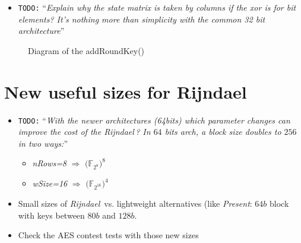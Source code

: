 \documentclass[10pt,a4paper,twoside]{llncs}
\newcommand{\todo}[1]{\texttt{\color{red}TODO:} ``\emph{#1}''}
\newcommand{\rijndael}{\emph{Rijndael}}
\newcommand{\Fq}[1]{\ensuremath{\mathbb{F}_#1}}
\newcommand{\Fpn}[2]{\ensuremath{\mathbb{F}_{#1^#2}}}
\begin{document}
\begin{itemize}
 \item \todo{Explain why the state matrix is taken by columns if the \emph{xor} is for bit elements? It's nothing more than simplicity with the common 32 bit architecture}
\end{itemize}

\begin{figure}[ht]
\begin{center}

\caption{Diagram of the addRoundKey()}
\label{fig:addRoundKey}
\end{center}
\end{figure}


\section{New useful sizes for Rijndael}\label{sec:newSizes}
\begin{itemize}
    \item \todo{With the newer architectures (64bits) which parameter changes can improve the cost of the \rijndael\,? \cite{Daemen:1999:EBC:1267115.1267119} In $64$ bits arch, a block size doubles to $256$ in two ways:} 
    \begin{itemize}
        \item \emph{nRows=8} $\Rightarrow$ $($\Fpn{2}{8}$)^8$
        \item \emph{wSize=16} $\Rightarrow$ $($\Fpn{2}{{16}}$)^4$
    \end{itemize}
    \item Small sizes of \rijndael\, vs. lightweight alternatives (like \emph{Present}: $64b$ block with keys between $80b$ and $128b$.
    \item Check the AES contest tests with those new sizes
\end{itemize}


\end{document}
